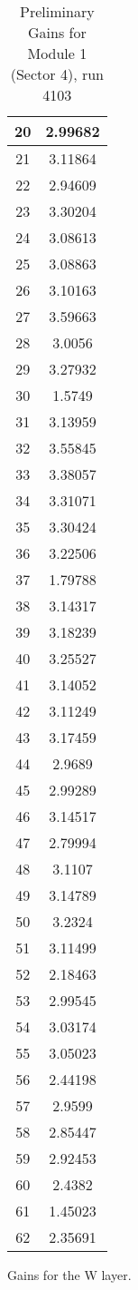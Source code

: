 \begin{table}[h]
\begin{subtable}[h]{2in}
{\begin{tabular}{|c|c|}
20	&	2.99682	\\	\hline
21	&	3.11864	\\	\hline
22	&	2.94609	\\	\hline
23	&	3.30204	\\	\hline
24	&	3.08613	\\	\hline
25	&	3.08863	\\	\hline
26	&	3.10163	\\	\hline
27	&	3.59663	\\	\hline
28	&	3.0056	\\	\hline
29	&	3.27932	\\	\hline
30	&	1.5749	\\	\hline
31	&	3.13959	\\	\hline
32	&	3.55845	\\	\hline
33	&	3.38057	\\	\hline
34	&	3.31071	\\	\hline
35	&	3.30424	\\	\hline
36	&	3.22506	\\	\hline
37	&	1.79788	\\	\hline
38	&	3.14317	\\	\hline
39	&	3.18239	\\	\hline
40	&	3.25527	\\	\hline
41	&	3.14052	\\	\hline
42	&	3.11249	\\	\hline
43	&	3.17459	\\	\hline
44	&	2.9689	\\	\hline
45	&	2.99289	\\	\hline
46	&	3.14517	\\	\hline
47	&	2.79994	\\	\hline
48	&	3.1107	\\	\hline
49	&	3.14789	\\	\hline
50	&	3.2324	\\	\hline
51	&	3.11499	\\	\hline
52	&	2.18463	\\	\hline
53	&	2.99545	\\	\hline
54	&	3.03174	\\	\hline
55	&	3.05023	\\	\hline
56	&	2.44198	\\	\hline
57	&	2.9599	\\	\hline
58	&	2.85447	\\	\hline
59	&	2.92453	\\	\hline
60	&	2.4382	\\	\hline
61	&	1.45023	\\	\hline
62	&	2.35691	\\	\hline
        \end{tabular}
        }
        \caption{Gains for the W layer.}
    \end{subtable}
    \caption{Preliminary Gains for Module 1 (Sector 4), run 4103}
\end{table}

